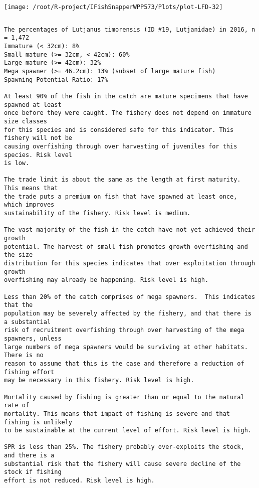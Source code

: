 \documentclass{report}\usepackage[]{graphicx}\usepackage[]{color}
\makeatletter
\def\maxwidth{ %
  \ifdim\Gin@nat@width>\linewidth
    \linewidth
  \else
    \Gin@nat@width
  \fi
}
\newenvironment{kframe}{%
 \def\at@end@of@kframe{}%
 \ifinner\ifhmode%
  \def\at@end@of@kframe{\end{minipage}}%
  \begin{minipage}{\columnwidth}%
 \fi\fi%
 \def\FrameCommand##1{\hskip\@totalleftmargin \hskip-\fboxsep
 \colorbox{shadecolor}{##1}\hskip-\fboxsep
     \hskip-\linewidth \hskip-\@totalleftmargin \hskip\columnwidth}%
 \MakeFramed {\advance\hsize-\width
   \@totalleftmargin\z@ \linewidth\hsize
   \@setminipage}}%
 {\par\unskip\endMakeFramed%
 \at@end@of@kframe}
\newenvironment{knitrout}{}{} %
\makeatother
\begin{document}
\begin{knitrout}
\texttt{[image: /root/R-project/IFishSnapperWPP573/Plots/plot-LFD-32]} 
\begin{kframe}\begin{verbatim}
\end{verbatim}
\end{kframe}
\clearpage
\newpage
\begin{kframe}\begin{verbatim}The percentages of Lutjanus timorensis (ID #19, Lutjanidae) in 2016, n = 1,472
Immature (< 32cm): 8%
Small mature (>= 32cm, < 42cm): 60%
Large mature (>= 42cm): 32%
Mega spawner (>= 46.2cm): 13% (subset of large mature fish)
Spawning Potential Ratio: 17%
 
At least 90% of the fish in the catch are mature specimens that have spawned at least
once before they were caught. The fishery does not depend on immature size classes
for this species and is considered safe for this indicator. This fishery will not be
causing overfishing through over harvesting of juveniles for this species. Risk level
is low.

The trade limit is about the same as the length at first maturity.  This means that
the trade puts a premium on fish that have spawned at least once, which improves
sustainability of the fishery. Risk level is medium.

The vast majority of the fish in the catch have not yet achieved their growth
potential. The harvest of small fish promotes growth overfishing and the size
distribution for this species indicates that over exploitation through growth
overfishing may already be happening. Risk level is high.

Less than 20% of the catch comprises of mega spawners.  This indicates that the
population may be severely affected by the fishery, and that there is a substantial
risk of recruitment overfishing through over harvesting of the mega spawners, unless
large numbers of mega spawners would be surviving at other habitats. There is no
reason to assume that this is the case and therefore a reduction of fishing effort
may be necessary in this fishery. Risk level is high.
 
Mortality caused by fishing is greater than or equal to the natural rate of
mortality. This means that impact of fishing is severe and that fishing is unlikely
to be sustainable at the current level of effort. Risk level is high.
 
SPR is less than 25%. The fishery probably over-exploits the stock, and there is a
substantial risk that the fishery will cause severe decline of the stock if fishing
effort is not reduced. Risk level is high.
 

\end{verbatim}
\end{kframe}
\end{knitrout}
\end{document}
